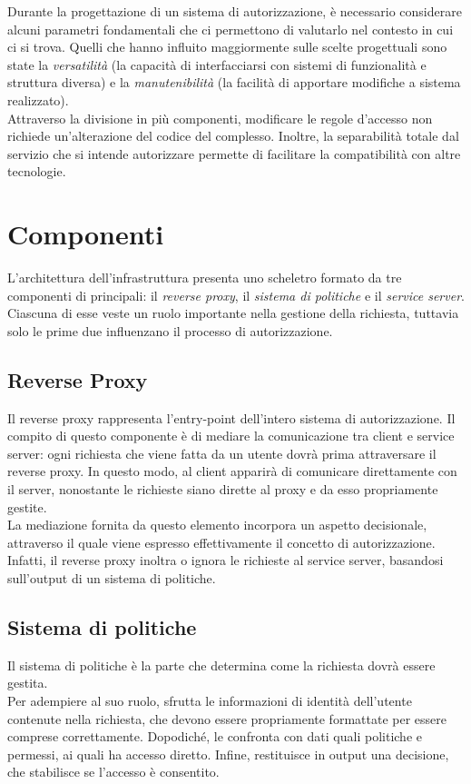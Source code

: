 Durante la progettazione di un sistema di autorizzazione, è necessario considerare alcuni parametri fondamentali che ci permettono di valutarlo 
nel contesto in cui ci si trova.
Quelli che hanno influito maggiormente sulle scelte progettuali sono state la \textit{versatilità} (la capacità di interfacciarsi con sistemi di 
funzionalità e struttura diversa)
e la \textit{manutenibilità} (la facilità di apportare modifiche a sistema realizzato).
\\ Attraverso la divisione in più componenti, modificare le regole d'accesso non richiede un'alterazione del codice del
complesso. Inoltre, la separabilità totale dal servizio che si intende autorizzare permette di facilitare la compatibilità con altre tecnologie.   

\section{Componenti}

L'architettura dell'infrastruttura presenta uno scheletro formato da tre componenti di principali: il \textit{reverse proxy}, il \textit{sistema di politiche} e il \textit{service server}. 
Ciascuna di esse veste un ruolo importante nella gestione della richiesta, tuttavia solo le prime due influenzano il processo di autorizzazione. 

\subsection{Reverse Proxy}
Il reverse proxy rappresenta l'entry-point dell'intero sistema di autorizzazione. Il compito di questo componente è di
mediare la comunicazione tra client e service server: ogni richiesta che viene fatta da un utente dovrà prima attraversare il reverse proxy. 
In questo modo, al client apparirà di comunicare direttamente con il server, nonostante le richieste siano dirette al proxy e da esso propriamente gestite. 
\\ La mediazione fornita da questo elemento incorpora un aspetto decisionale, attraverso il quale viene espresso effettivamente il concetto di autorizzazione. 
Infatti, il reverse proxy inoltra o ignora le richieste al service server, basandosi sull'output di un sistema di politiche.  
 
\subsection{Sistema di politiche}
Il sistema di politiche è la parte che determina come la richiesta dovrà essere gestita. 
\\ Per adempiere al suo ruolo, sfrutta le informazioni di identità dell'utente contenute nella richiesta, che devono essere propriamente formattate per essere comprese correttamente. 
Dopodiché, le confronta con dati quali politiche e permessi, ai quali ha accesso diretto.
Infine, restituisce in output una decisione, che stabilisce se l'accesso è consentito.  

